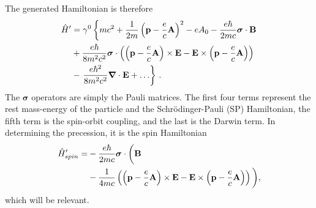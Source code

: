 The generated Hamiltonian is therefore
\begin{alignat}{1}
  \notag\hat{H}'&=\gamma^{0}\left\{mc^{2}+\frac{1}{2m}\left(\mathbf{p}-\frac{e}{c}\mathbf{A}\right)^{2}-eA_{0}-\frac{e\hbar}{2mc}\boldsymbol{\sigma}\cdot\mathbf{B}\right.\\
  \notag&+\frac{e\hbar}{8m^{2}c^{2}}\boldsymbol{\sigma}\cdot\left(\left(\mathbf{p}-\frac{e}{c}\mathbf{A}\right)\times\mathbf{E}-\mathbf{E}\times\left(\mathbf{p}-\frac{e}{c}\mathbf{A}\right)\right)\\
  \label{FW02}&-\left.\frac{e\hbar^{2}}{8m^{2}c^{2}}\boldsymbol{\nabla}\cdot\mathbf{E}+\ldots\right\}\,.
\end{alignat}
The $\boldsymbol{\sigma}$ operators are simply the Pauli matrices. The first four terms represent the rest mass-energy of the particle and the Schr\"{o}dinger-Pauli (SP) Hamiltonian, the fifth term is the spin-orbit coupling, and the last is the Darwin term. In determining the precession, it is the spin Hamiltonian
\begin{alignat}{1}
  \notag\hat{H}'_{spin}=&-\frac{e\hbar}{2mc}\boldsymbol{\sigma}\cdot\bigg(\mathbf{B}\\
  \label{FW03}&-\frac{1}{4mc}\left(\left(\mathbf{p}-\frac{e}{c}\mathbf{A}\right)\times\mathbf{E}-\mathbf{E}\times\left(\mathbf{p}-\frac{e}{c}\mathbf{A}\right)\right)\bigg),
\end{alignat}
which will be relevant.
